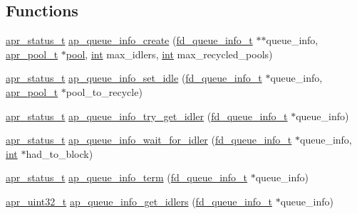 \subsection*{Functions}
\begin{DoxyCompactItemize}
\item 
\hyperlink{group__apr__errno_gaa5105fa83cc322f09382292db8b47593}{apr\+\_\+status\+\_\+t} \hyperlink{group__APACHE__MPM__EVENT_ga4d0d706674f511d288505e01485464aa}{ap\+\_\+queue\+\_\+info\+\_\+create} (\hyperlink{structfd__queue__info__t}{fd\+\_\+queue\+\_\+info\+\_\+t} $\ast$$\ast$queue\+\_\+info, \hyperlink{structapr__pool__t}{apr\+\_\+pool\+\_\+t} $\ast$\hyperlink{group__APR__XLATE_gabb3cd978f04c73d0b763c391e9bfde73}{pool}, \hyperlink{pcre_8txt_a42dfa4ff673c82d8efe7144098fbc198}{int} max\+\_\+idlers, \hyperlink{pcre_8txt_a42dfa4ff673c82d8efe7144098fbc198}{int} max\+\_\+recycled\+\_\+pools)
\item 
\hyperlink{group__apr__errno_gaa5105fa83cc322f09382292db8b47593}{apr\+\_\+status\+\_\+t} \hyperlink{group__APACHE__MPM__EVENT_ga7673a5c9eda89916d6df264fdfdba2b5}{ap\+\_\+queue\+\_\+info\+\_\+set\+\_\+idle} (\hyperlink{structfd__queue__info__t}{fd\+\_\+queue\+\_\+info\+\_\+t} $\ast$queue\+\_\+info, \hyperlink{structapr__pool__t}{apr\+\_\+pool\+\_\+t} $\ast$pool\+\_\+to\+\_\+recycle)
\item 
\hyperlink{group__apr__errno_gaa5105fa83cc322f09382292db8b47593}{apr\+\_\+status\+\_\+t} \hyperlink{group__APACHE__MPM__EVENT_ga41f3d03ed7c7a2b8a6bbfa78c17d3475}{ap\+\_\+queue\+\_\+info\+\_\+try\+\_\+get\+\_\+idler} (\hyperlink{structfd__queue__info__t}{fd\+\_\+queue\+\_\+info\+\_\+t} $\ast$queue\+\_\+info)
\item 
\hyperlink{group__apr__errno_gaa5105fa83cc322f09382292db8b47593}{apr\+\_\+status\+\_\+t} \hyperlink{group__APACHE__MPM__EVENT_ga61e0f50817329b124d2ea67d9cfe0cbf}{ap\+\_\+queue\+\_\+info\+\_\+wait\+\_\+for\+\_\+idler} (\hyperlink{structfd__queue__info__t}{fd\+\_\+queue\+\_\+info\+\_\+t} $\ast$queue\+\_\+info, \hyperlink{pcre_8txt_a42dfa4ff673c82d8efe7144098fbc198}{int} $\ast$had\+\_\+to\+\_\+block)
\item 
\hyperlink{group__apr__errno_gaa5105fa83cc322f09382292db8b47593}{apr\+\_\+status\+\_\+t} \hyperlink{group__APACHE__MPM__EVENT_gaae8ca4deac4b25a12d826ba68569f608}{ap\+\_\+queue\+\_\+info\+\_\+term} (\hyperlink{structfd__queue__info__t}{fd\+\_\+queue\+\_\+info\+\_\+t} $\ast$queue\+\_\+info)
\item 
\hyperlink{group__apr__platform_ga558548a135d8a816c4787250744ea147}{apr\+\_\+uint32\+\_\+t} \hyperlink{group__APACHE__MPM__EVENT_gabbd4dfde021d8cf397976af8b8039a53}{ap\+\_\+queue\+\_\+info\+\_\+get\+\_\+idlers} (\hyperlink{structfd__queue__info__t}{fd\+\_\+queue\+\_\+info\+\_\+t} $\ast$queue\+\_\+info)
$$
\end{DoxyCompactItemize}
